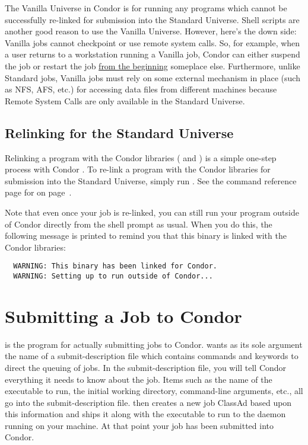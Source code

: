 The Vanilla Universe in Condor is for running any programs which cannot
be successfully re-linked for submission into the Standard Universe.
Shell scripts are another good reason to use the Vanilla Universe.
However, here's the down side: Vanilla jobs cannot checkpoint or use
remote system calls. So, for example, when a user returns to a
workstation running a Vanilla job, Condor can either suspend the job or
restart the job \underline{from the beginning} someplace else.
Furthermore, unlike Standard jobs, Vanilla jobs must rely on some
external mechanism in place (such as NFS, AFS, etc.) for accessing data
files from different machines because Remote System Calls are only
available in the Standard Universe.

\subsection{Relinking for the Standard Universe}

Relinking a program with the Condor libraries ( and
) is a simple one-step process with Condor
\VersionNotice. To re-link a program with the Condor libraries for
submission into the Standard Universe, simply run . See
the command reference page for  on
page~\pageref{man-condor-compile}.

Note that even once your job is re-linked, you can still run your program
outside of Condor directly from the shell prompt as usual.  When you do
this, the following message is printed to remind you that this 
binary is linked with the Condor libraries:
\begin{verbatim}
  WARNING: This binary has been linked for Condor.
  WARNING: Setting up to run outside of Condor...
\end{verbatim}

\section{Submitting a Job to Condor}

 is the program for actually submitting jobs to Condor.
 wants as its sole argument the name of a submit-description 
file which contains commands and keywords to direct the queuing of jobs.
In the submit-description file, you will tell Condor everything it needs
to know about the job.  Items such as the name of the executable to run,
the initial working directory, command-line arguments, etc., all go into
the submit-description file.   then creates a new job
ClassAd based upon this information and ships it along with the executable to run 
to the  daemon running on your machine.  At that point your job has
been submitted into Condor.

